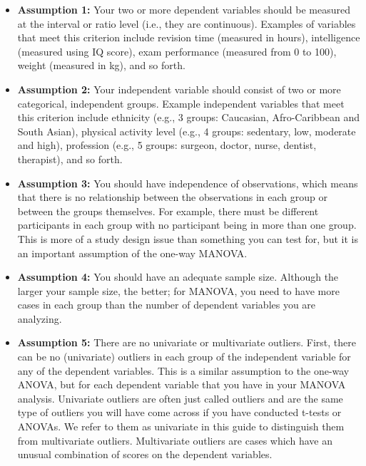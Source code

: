 \documentclass[a4paper,12pt]{article}
\begin{document}
\begin{itemize}
\item \textbf{Assumption 1:} Your two or more dependent variables should be measured at the interval or ratio level (i.e., they are continuous). Examples of variables that meet this criterion include revision time (measured in hours), intelligence (measured using IQ score), exam performance (measured from 0 to 100), weight (measured in kg), and so forth.\\

\item \textbf{Assumption 2:} Your independent variable should consist of two or more categorical, independent groups. Example independent variables that meet this criterion include ethnicity (e.g., 3 groups: Caucasian, Afro-Caribbean and South Asian), physical activity level (e.g., 4 groups: sedentary, low, moderate and high), profession (e.g., 5 groups: surgeon, doctor, nurse, dentist, therapist), and so forth.\\

\item \textbf{Assumption 3:} You should have independence of observations, which means that there is no relationship between the observations in each group or between the groups themselves. For example, there must be different participants in each group with no participant being in more than one group. This is more of a study design issue than something you can test for, but it is an important assumption of the one-way MANOVA.\\

\item \textbf{Assumption 4:} You should have an adequate sample size. Although the larger your sample size, the better; for MANOVA, you need to have more cases in each group than the number of dependent variables you are analyzing.\\

\item \textbf{Assumption 5:} There are no univariate or multivariate outliers. First, there can be no (univariate) outliers in each group of the independent variable for any of the dependent variables. This is a similar assumption to the one-way ANOVA, but for each dependent variable that you have in your MANOVA analysis. Univariate outliers are often just called outliers and are the same type of outliers you will have come across if you have conducted t-tests or ANOVAs. We refer to them as univariate in this guide to distinguish them from multivariate outliers. Multivariate outliers are cases which have an unusual combination of scores on the dependent variables. \\ \smallskip



\end{itemize}
\end{document}
